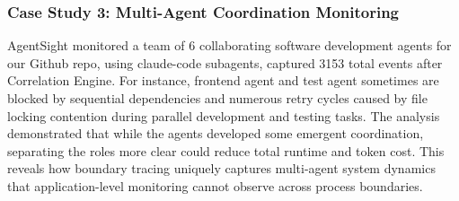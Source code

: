 \subsubsection{Case Study 3: Multi-Agent Coordination Monitoring}

AgentSight monitored a team of 6 collaborating software development agents for our Github repo, using claude-code subagents\cite{subagents}, captured 3153 total events after Correlation Engine. For instance, frontend agent and test agent sometimes are blocked by sequential dependencies and numerous retry cycles caused by file locking contention during parallel development and testing tasks. The analysis demonstrated that while the agents developed some emergent coordination, separating the roles more clear could reduce total runtime and token cost. This reveals how boundary tracing uniquely captures multi-agent system dynamics that application-level monitoring cannot observe across process boundaries.




